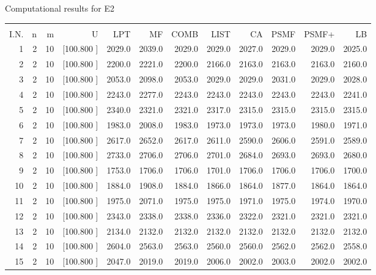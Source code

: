 \documentclass[12pt,a4paper]{article}
\begin{document}
\newpage
\begin{center}
 Computational results for E2 {\tiny
\begin{tabular}{r r r r r r r r r r r r}\hline
    &   &   &          &        &        &        &        &        &        &        &       \\[-0.1in]
  I.N.  &  n  &  m  &  U  &  LPT  &  MF  &  COMB  &  LIST  &  CA  & PSMF &PSMF+ & LB \\[0.03in]
\hline
   1&  2& 10&[100.800   ]&  2029.0&  2039.0&  2029.0&  2029.0&  2027.0&  2029.0&  2029.0&  2025.0\\[-0.02in]
   2&  2& 10&[100.800   ]&  2200.0&  2221.0&  2200.0&  2166.0&  2163.0&  2163.0&  2163.0&  2160.0\\[-0.02in]
   3&  2& 10&[100.800   ]&  2053.0&  2098.0&  2053.0&  2029.0&  2029.0&  2031.0&  2029.0&  2028.0\\[-0.02in]
   4&  2& 10&[100.800   ]&  2243.0&  2277.0&  2243.0&  2243.0&  2243.0&  2243.0&  2243.0&  2241.0\\[-0.02in]
   5&  2& 10&[100.800   ]&  2340.0&  2321.0&  2321.0&  2317.0&  2315.0&  2315.0&  2315.0&  2315.0\\[-0.02in]
   6&  2& 10&[100.800   ]&  1983.0&  2008.0&  1983.0&  1973.0&  1973.0&  1973.0&  1980.0&  1971.0\\[-0.02in]
   7&  2& 10&[100.800   ]&  2617.0&  2652.0&  2617.0&  2611.0&  2590.0&  2606.0&  2591.0&  2589.0\\[-0.02in]
   8&  2& 10&[100.800   ]&  2733.0&  2706.0&  2706.0&  2701.0&  2684.0&  2693.0&  2693.0&  2680.0\\[-0.02in]
   9&  2& 10&[100.800   ]&  1753.0&  1706.0&  1706.0&  1701.0&  1706.0&  1706.0&  1706.0&  1700.0\\[-0.02in]
  10&  2& 10&[100.800   ]&  1884.0&  1908.0&  1884.0&  1866.0&  1864.0&  1877.0&  1864.0&  1864.0\\[-0.02in]
  11&  2& 10&[100.800   ]&  1975.0&  2071.0&  1975.0&  1975.0&  1971.0&  1975.0&  1974.0&  1970.0\\[-0.02in]
  12&  2& 10&[100.800   ]&  2343.0&  2338.0&  2338.0&  2336.0&  2322.0&  2321.0&  2321.0&  2321.0\\[-0.02in]
  13&  2& 10&[100.800   ]&  2134.0&  2132.0&  2132.0&  2132.0&  2132.0&  2132.0&  2132.0&  2132.0\\[-0.02in]
  14&  2& 10&[100.800   ]&  2604.0&  2563.0&  2563.0&  2560.0&  2560.0&  2562.0&  2562.0&  2558.0\\[-0.02in]
  15&  2& 10&[100.800   ]&  2047.0&  2019.0&  2019.0&  2006.0&  2002.0&  2003.0&  2002.0&  2002.0\\[-0.02in]

\end{tabular}}
\end{center}
\end{document}
